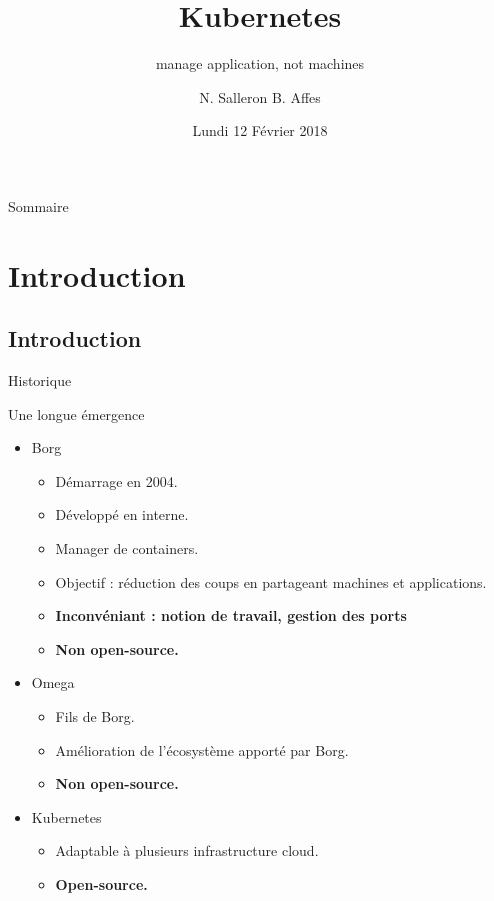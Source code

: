 \documentclass{bredelebeamer}
\title[Kubernetes]{Kubernetes}
\subtitle{manage application, not machines}
\author{N. Salleron B. Affes}
\date{Lundi 12 Février 2018}
\begin{document}
\begin{frame}
  \titlepage
\end{frame}

\begin{frame}{Sommaire}
  \tableofcontents
\end{frame}

\section{Introduction}
\subsection{Introduction}

\begin{frame}{Historique}
\begin{block}{Une longue émergence}
\begin{itemize}
\item Borg
	\begin{itemize}
	\item Démarrage en 2004.
	\item Développé en interne.
	\item Manager de containers.
	\item Objectif : réduction des coups en partageant machines et applications.
	\item \textbf{Inconvéniant : notion de travail, gestion des ports}
	\item \textbf{Non open-source.}
	\end{itemize}	\pause
\item Omega	
	\begin{itemize}
	\item Fils de Borg.
	\item Amélioration de l'écosystème apporté par Borg.
	\item  \textbf{Non open-source.}
	\end{itemize}   \pause
\item Kubernetes
	\begin{itemize}
	\item Adaptable à plusieurs infrastructure cloud.
	\item  \textbf{Open-source.}
	\end{itemize}
\end{itemize}
\end{block}
\end{frame}
\end{document}
